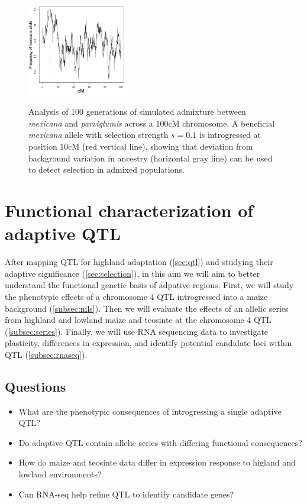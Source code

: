 \begin{figure}
  \centering
  \caption{Analysis of 100 generations of simulated admixture between \emph{mexicana} and \emph{parviglumis} across a 100cM chromosome.   A  beneficial \emph{mexicana} allele with selection strength $s=0.1$ is introgressed at position 10cM (red vertical line), showing that  deviation from background variation in ancestry (horizontal gray line) can be used to detect selection in admixed populations. } 
   \includegraphics[width=0.4\textwidth]{admix.png}
\label{fig:yaniv}
\end{figure}

\section{Functional characterization of adaptive QTL} \label{sec:funchar}

After mapping QTL for highland adaptation (\ref{sec:qtl}) and studying their adaptive significance (\ref{sec:selection}), in this aim we will aim to better understand the functional genetic basis of adpative regions.  First, we will study the phenotypic effects of a chromosome 4 QTL introgressed into a maize background (\ref{subsec:nils}).  Then we will evaluate the effects of an allelic series from highland and lowland maize and teosinte at the chromosome 4 QTL (\ref{subsec:series}).  Finally, we will use RNA sequencing data to investigate plasticity, differences in expression, and identify potential candidate loci within QTL (\ref{subsec:rnaseq}).

\subsection{Questions}
\begin{itemize}[topsep=0pt,itemsep=-1ex,partopsep=1ex,parsep=1ex]
\item What are the phenotypic consequences of introgressing a single adaptive QTL?
\item Do adaptive QTL contain allelic series with differing functional consequences?
\item How do maize and teosinte data differ in expression response to higland and lowland environments?
\item Can RNA-seq help refine QTL to identify candidate genes?
\end{itemize}

